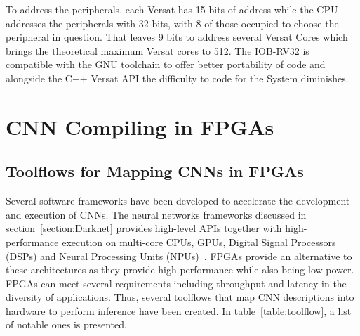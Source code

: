 \documentclass[conference]{IEEEtran}
\begin{document}
To address the peripherals, each Versat has 15 bits of address while the CPU addresses
 the peripherals with 32 bits, with 8 of those occupied to choose
 the peripheral in question. That leaves 9 bits to address several Versat Cores
 which brings the theoretical maximum Versat cores to 512. The IOB-RV32 is compatible with the
 GNU toolchain to offer better portability of code and alongside the C++ Versat API the difficulty
 to code for the System diminishes.


\section{CNN Compiling in FPGAs}
\label{section:CNNVersat}

%

\subsection{Toolflows for Mapping CNNs in FPGAs}
\label{section:toolflow}

Several software frameworks have been developed to accelerate the development and
execution of CNNs. The neural networks frameworks discussed in
section~\ref{section:Darknet} provides high-level APIs together with high-performance 
execution on multi-core CPUs, GPUs, Digital Signal Processors (DSPs)
and Neural Processing Units (NPUs)~\cite{smartphones}. FPGAs provide an
alternative to these architectures as they provide high performance while also
being low-power. FPGAs can meet several requirements including throughput and latency
in the diversity of applications. Thus, several toolflows that map CNN descriptions
into hardware to perform inference have been created. In
table~\ref{table:toolflow}, a list of notable ones is presented.
\end{document}
